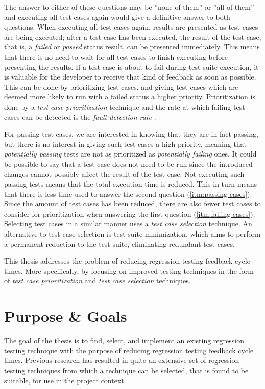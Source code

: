 \documentclass[a4paper,english,12pt]{report}
\begin{document}
The answer to either of these questions may be ''none of them'' or ''all of them'' and executing all test cases again would give a definitive answer to both questions. When executing all test cases again, results are presented as test cases are being executed; after a test case has been executed, the result of the test case, that is, a \textit{failed} or \textit{passed} status result, can be presented immediately. This means that there is no need to wait for all test cases to finish executing before presenting the results. If a test case is about to fail during test suite execution, it is valuable for the developer to receive that kind of feedback as soon as possible. This can be done by prioritizing test cases, and giving test cases which are deemed more likely to run with a failed status a higher priority. Prioritization is done by a \textit{test case prioritization} technique and the rate at which failing test cases can be detected is the \textit{fault detection rate} \citep{runeson2012regression}.

For passing test cases, we are interested in knowing that they are in fact passing, but there is no interest in giving such test cases a high priority, meaning that \textit{potentially passing} tests are not as prioritized as \textit{potentially failing} ones. It could be possible to say that a test case does not need to be run since the introduced changes cannot possibly affect the result of the test case. Not executing such passing tests means that the total execution time is reduced. This in turn means that there is less time used to answer the second question (\ref{itm:passing-cases}). Since the amount of test cases has been reduced, there are also fewer test cases to consider for prioritization when answering the first question (\ref{itm:failing-cases}). Selecting test cases in a similar manner uses a \textit{test case selection} technique. An alternative to test case selection is test suite minimization, which aims to perform a permanent reduction to the test suite, eliminating redundant test cases. \citep{runeson2012regression}

This thesis addresses the problem of reducing regression testing feedback cycle times. More specifically, by focusing on improved testing techniques in the form of \textit{test case prioritization} and \textit{test case selection} techniques.

\section{Purpose \& Goals}
The goal of the thesis is to find, select, and implement an existing regression testing technique with the purpose of reducing regression testing feedback cycle times. Previous research has resulted in quite an extensive set of regression testing techniques from which a technique can be selected, that is found to be suitable, for use in the project context. 
\end{document}
